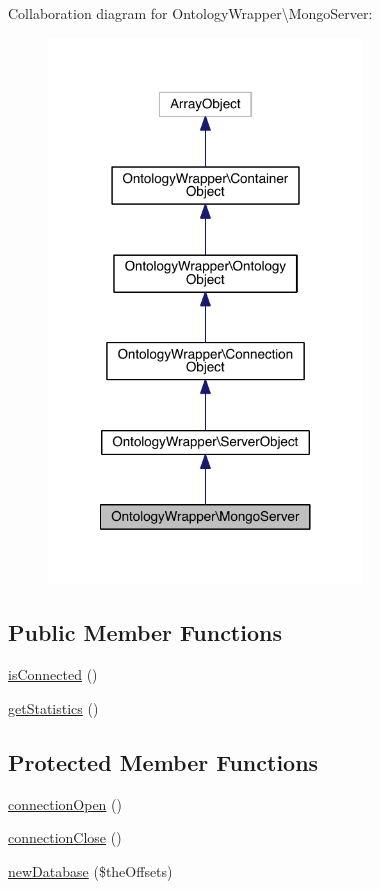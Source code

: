 Collaboration diagram for Ontology\-Wrapper\textbackslash{}Mongo\-Server\-:\nopagebreak
\begin{figure}[H]
\begin{center}
\leavevmode
\includegraphics[width=236pt]{class_ontology_wrapper_1_1_mongo_server__coll__graph}
\end{center}
\end{figure}
\subsection*{Public Member Functions}
\begin{DoxyCompactItemize}
\item 
\hyperlink{class_ontology_wrapper_1_1_mongo_server_a2bde1d3f28624801cbb42bf8b94673d4}{is\-Connected} ()
\item 
\hyperlink{class_ontology_wrapper_1_1_mongo_server_ad0339362ebaba5c344a179ef11d4e102}{get\-Statistics} ()
\end{DoxyCompactItemize}
\subsection*{Protected Member Functions}
\begin{DoxyCompactItemize}
\item 
\hyperlink{class_ontology_wrapper_1_1_mongo_server_abd478e3c641bbe1f40f7edf41e986558}{connection\-Open} ()
\item 
\hyperlink{class_ontology_wrapper_1_1_mongo_server_a0817afd4db82e176e0ebb6c7d5752e6e}{connection\-Close} ()
\item 
\hyperlink{class_ontology_wrapper_1_1_mongo_server_a511427a098b640515401bbb6baba7515}{new\-Database} (\$the\-Offsets)
\end{DoxyCompactItemize}
